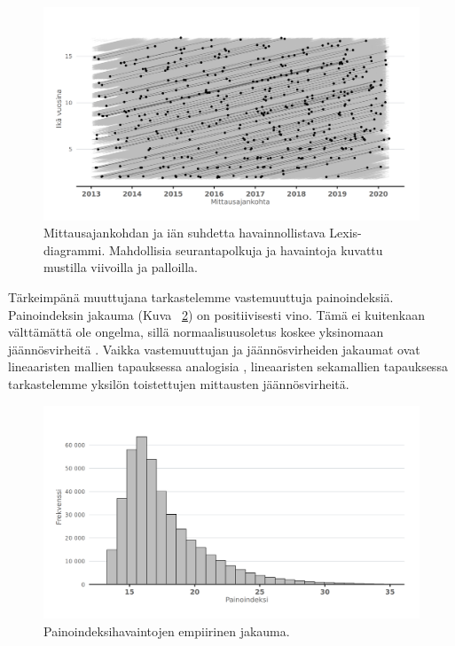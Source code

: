 \documentclass[finnish]{docopts}
\begin{document}
\begin{figure}[H]
\centering
  \includegraphics[scale=0.8]{kuvaajat/lex_plot.png}
  \caption{Mittausajankohdan ja iän suhdetta havainnollistava Lexis-diagrammi. Mahdollisia seurantapolkuja ja havaintoja kuvattu mustilla viivoilla ja palloilla.}
  \label{fig:lexisplot}
\end{figure}

Tärkeimpänä muuttujana tarkastelemme vastemuuttuja painoindeksiä. Painoindeksin jakauma (Kuva ~\ref{fig:bmi_dens}) on positiivisesti vino. Tämä ei kuitenkaan välttämättä ole ongelma, sillä normaalisuusoletus koskee yksinomaan jäännösvirheitä \cite{west14}. Vaikka vastemuuttujan ja jäännösvirheiden jakaumat ovat lineaaristen mallien tapauksessa analogisia \cite{fitzmaurice11}, lineaaristen sekamallien tapauksessa tarkastelemme yksilön toistettujen mittausten jäännösvirheitä.\\

\begin{figure}[ht]
\centering
  \includegraphics[scale=0.8]{kuvaajat/bmi_dens.png}
  \caption{Painoindeksihavaintojen empiirinen jakauma.}
  \label{fig:bmi_dens}
\end{figure}
\end{document}
